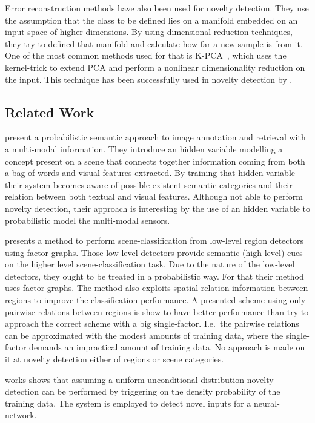 Error reconstruction methods have also been used for novelty detection.
They use the assumption that the class to be defined lies on a manifold embedded
on an input space of higher dimensions. By using dimensional reduction
techniques, they try to defined that manifold and calculate how far a new sample
is from it.
One of the most common methods used for that is
\gls{K-PCA}~\cite{scholkopf1997kernel}, which uses the kernel-trick to extend
\gls{PCA} and perform a nonlinear dimensionality reduction on the input.
This technique has been successfully used in novelty detection by
\cite{Hoffmann2007863}.

\subsection{Related Work}
\cite{zhang2005probabilistic} present a probabilistic semantic approach to image
annotation and retrieval with a multi-modal information. They introduce an
hidden variable modelling a concept present on a scene that connects together
information coming from both a bag of words and visual features extracted. By
training that hidden-variable their system becomes aware of possible existent
semantic categories and their relation between both textual and visual features.
Although not able to perform novelty detection, their approach is interesting by
the use of an hidden variable to probabilistic model the multi-modal sensors.

\cite{boutell2006factor} presents a method to perform scene-classification
from low-level region detectors using factor graphs. Those low-level detectors
provide semantic (high-level) cues on the higher level scene-classification
task. Due to the nature of the low-level detectors, they ought to be treated
in a probabilistic way. For that their method uses factor graphs. The method
also exploits spatial relation information between regions to improve the
classification performance. A presented scheme using only pairwise relations
between regions is show to have better performance than try to approach the
correct scheme with a big single-factor. I.e.\ the pairwise relations can be
approximated with the modest amounts of training data, where the single-factor
demands an impractical amount of training data.
No approach is made on it at novelty detection either of regions or scene
categories. 

\cite{bishop1994novelty} works shows that assuming a uniform unconditional
distribution novelty detection can be performed by triggering on the
density probability of the training data. The system is employed to detect novel
inputs for a neural-network.

